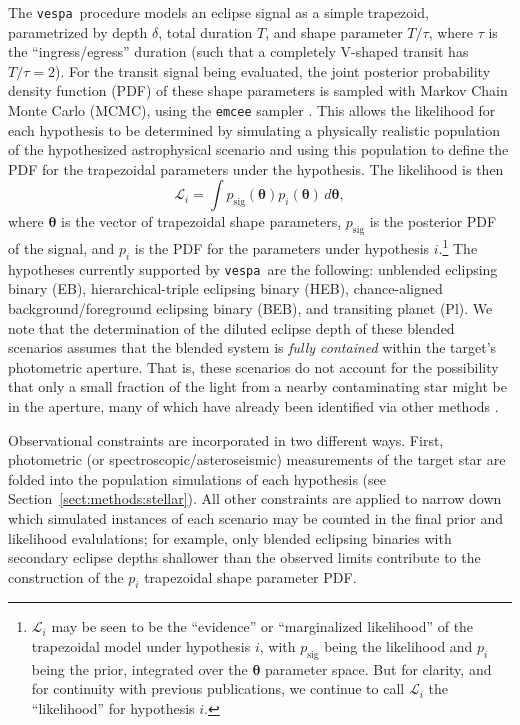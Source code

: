 \documentclass{emulateapj}
\newcommand{\eqlabel}[1]{\label{eq:#1}}
\newcommand{\sectionname}{Section}
\newcommand{\Sect}[1]{\sectionname~\ref{sect:#1}}
\newcommand{\sect}[1]{\Sect{#1}}
\newcommand{\vespa}{\texttt{vespa}}
\newcommand{\bvec}[1]{{\ensuremath{\boldsymbol{#1}}}}
\begin{document}
The \vespa\ procedure models an eclipse signal as a simple trapezoid,
parametrized by depth $\delta$, total duration $T$, and shape
parameter $T / \tau$, where $\tau$ is the ``ingress/egress'' duration
(such that a completely V-shaped transit has $T/\tau = 2$).  For the
transit signal being evaluated, the joint posterior probability
density function (PDF) of these shape parameters is sampled with
Markov Chain Monte Carlo (MCMC), using the \texttt{emcee} sampler
\citep{emcee}.  This allows the likelihood for each hypothesis to be
determined by simulating a physically realistic population of the
hypothesized astrophysical scenario and using this population to
define the PDF for the trapezoidal parameters under the hypothesis.
The likelihood is then
\begin{equation}
  \eqlabel{lhood}
  \mathcal L_i = \displaystyle \int p_\mathrm{sig}\left(\bvec{\theta}\right)
                                    p_i\left(\bvec{\theta}\right)\,d\bvec{\theta},
\end{equation}
where $\bvec{\theta}$ is the vector of trapezoidal shape parameters,
$p_\mathrm{sig}$ is the posterior PDF of the signal, and $p_i$ is the
PDF for the parameters under hypothesis $i$.\footnote{$\mathcal L_i$
  may be seen to be the ``evidence'' or ``marginalized likelihood'' of
  the trapezoidal model under hypothesis $i$, with $p_\mathrm{sig}$
  being the likelihood and $p_i$ being the prior, integrated over the
  $\bvec{\theta}$ parameter space.  But for clarity, and for
  continuity with previous publications, we continue to call $\mathcal
  L_i$ the ``likelihood'' for hypothesis $i$.}  The hypotheses
currently supported by \vespa\ are the following: unblended eclipsing
binary (EB), hierarchical-triple eclipsing binary (HEB),
chance-aligned background/foreground eclipsing binary (BEB), and
transiting planet (Pl).  We note that the determination of the diluted
eclipse depth of these blended scenarios assumes that the blended
system is \emph{fully contained} within the target's photometric
aperture.  That is, these scenarios do not account for the possibility
that only a small fraction of the light from a nearby contaminating
star might be in the aperture, many of which have already been
identified via other methods \cite{Bryson:2013,Coughlin:2014}.  

Observational constraints are incorporated in two different ways.
First, photometric (or spectroscopic/asteroseismic) measurements of
the target star are folded into the population simulations of each
hypothesis (see \sect{methods:stellar}).  All other constraints are
applied to narrow down which simulated instances of each scenario may
be counted in the final prior and likelihood evalulations; for example,
only blended eclipsing binaries with secondary eclipse depths
shallower than the observed limits contribute to the construction of
the $p_i$ trapezoidal shape parameter PDF.
\end{document}
